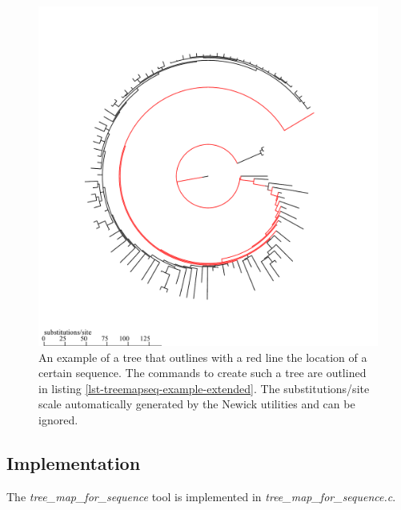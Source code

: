 \begin{figure}
  \includegraphics[scale=0.7]{tree-stroke.pdf}
  \caption{An example of a tree that outlines with a red line the
    location of a certain sequence. The commands to create such a tree
    are outlined in listing
    \ref{lst-treemapseq-example-extended}. The substitutions/site
    scale automatically generated by the Newick utilities
    \cite{newick_tools} and can be ignored.}
  \label{fig-treemapseq}
\end{figure}

\subsection{Implementation}
The \emph{tree\_map\_for\_sequence} tool is implemented in \newline
\emph{tree\_map\_for\_sequence.c}.

